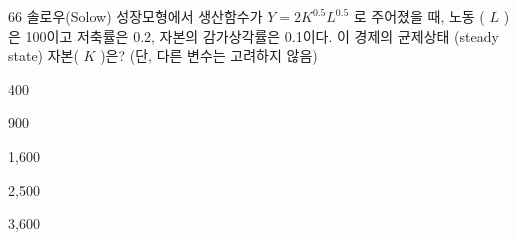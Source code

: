 \begin{question}{66}
솔로우(Solow) 성장모형에서 생산함수가 $Y=2K^{0.5}L^{0.5}$ 로 주어졌을 때, 노동 ( $L$ )은 100이고 저축률은 0.2, 자본의 감가상각률은 0.1이다. 이 경제의 균제상태 (steady state) 자본( $K$ )은? (단, 다른 변수는 고려하지 않음)
\begin{choices}
  \item 400
  \item 900
  \item 1,600
  \item 2,500
  \item 3,600
\end{choices}
\end{question}
